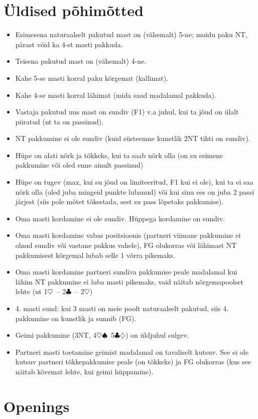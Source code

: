\documentclass[10pt]{article}
\renewcommand{\c}{$\clubsuit$}
\renewcommand{\d}{$\diamondsuit$}
\newcommand{\h}{$\heartsuit$}
\newcommand{\s}{$\spadesuit$}
\begin{document}
\section{Üldised põhimõtted}

\begin{itemize}
\item Esimesena naturaalselt pakutud mast on (vähemalt) 5-ne; muidu paku NT, pärast võid ka 4-st masti pakkuda.
\item Teisena pakutud mast on (vähemalt) 4-ne.
\item Kahe 5-se masti korral paku kõrgemat (kallimat).
\item Kahe 4-se masti korral lähimat (mida saad madalamal pakkuda).
\item Vastaja pakutud uus mast on sundiv (F1) v.a juhul, kui ta jõud on ülalt piiratud (nt ta on passinud).
\item NT pakkumine ei ole sundiv (kuid süsteemne kunstlik 2NT tihti on sundiv).
\item Hüpe on alati nõrk ja tõkkeks, kui ta saab nõrk olla (on su esimene pakkumine või oled enne ainult passinud)
\item Hüpe on tugev (max, kui su jõud on limiteeritud, F1 kui ei ole), kui ta ei saa nõrk olla (oled juba mingeid punkte lubanud) või kui sinu ees on juba 2 passi järjest (siis pole mõtet tõkestada, sest su pass lõpetaks pakkumise).
\item Oma masti kordamine ei ole sundiv. Hüppega kordamine on sundiv.
\item Oma masti kordamine vabas positsioonis (partneri viimane pakkumine ei olnud sundiv või vastane pakkus vahele), FG olukorras või lähimast NT pakkumisest kõrgemal lubab selle 1 võrra pikemaks.
\item Oma masti kordamine partneri sundiva pakkumise peale madalamal kui lähim NT pakkumine ei luba masti pikemaks, vaid näitab nõrgemapoolset lehte (nt 1\h\ – 2\c\ – 2\h)
\item 4. masti sund: kui 3 masti on meie poolt naturaalselt pakutud, siis 4. pakkumine on kunstlik ja sunnib (FG).
\item Geimi pakkumine (3NT, 4\h \s\ 5\c \d ) on üldjuhul sulgev.
\item Partneri masti toetamine geimist madalamal on tavaliselt kutsuv. See ei ole kutsuv partneri tõkkepakkumise peale (on tõkkeks) ja FG olukorras (kus see näitab kõvemat lehte, kui geimi hüppamine).
\end{itemize}


\newpage
\section{Openings}
\end{document}
